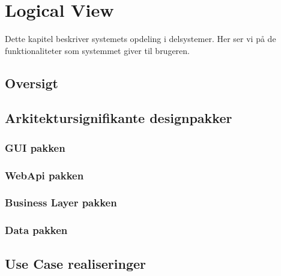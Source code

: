 \section{Logical View}
Dette kapitel beskriver systemets opdeling i delsystemer. Her ser vi på de funktionaliteter som systemmet giver til brugeren. 

\subsection{Oversigt}


\newpage
\subsection{Arkitektursignifikante designpakker	}
\subsubsection{GUI pakken}


\newpage
\subsubsection{WebApi pakken}


\newpage
\subsubsection{Business Layer pakken}


\newpage
\subsubsection{Data pakken}


\newpage
\subsection{Use Case realiseringer}
